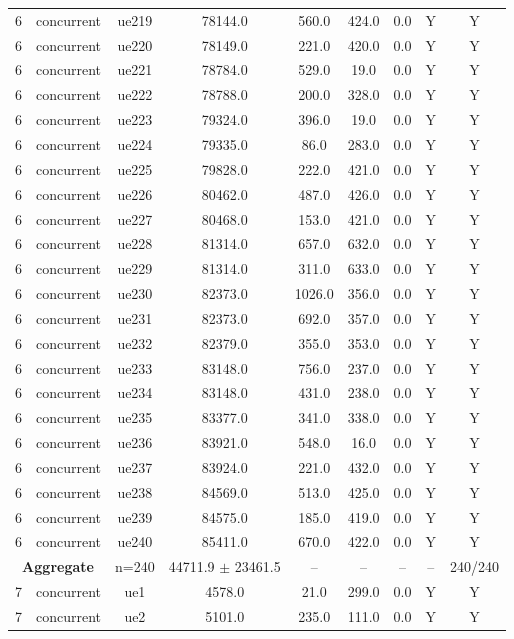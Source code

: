 \begin{table}[ht]
\begin{tabular}{|c|c|c|c|c|c|c|c|c|}
6 & concurrent & ue219 & 78144.0 & 560.0 & 424.0 & 0.0 & Y & Y \\
6 & concurrent & ue220 & 78149.0 & 221.0 & 420.0 & 0.0 & Y & Y \\
6 & concurrent & ue221 & 78784.0 & 529.0 & 19.0 & 0.0 & Y & Y \\
6 & concurrent & ue222 & 78788.0 & 200.0 & 328.0 & 0.0 & Y & Y \\
6 & concurrent & ue223 & 79324.0 & 396.0 & 19.0 & 0.0 & Y & Y \\
6 & concurrent & ue224 & 79335.0 & 86.0 & 283.0 & 0.0 & Y & Y \\
6 & concurrent & ue225 & 79828.0 & 222.0 & 421.0 & 0.0 & Y & Y \\
6 & concurrent & ue226 & 80462.0 & 487.0 & 426.0 & 0.0 & Y & Y \\
6 & concurrent & ue227 & 80468.0 & 153.0 & 421.0 & 0.0 & Y & Y \\
6 & concurrent & ue228 & 81314.0 & 657.0 & 632.0 & 0.0 & Y & Y \\
6 & concurrent & ue229 & 81314.0 & 311.0 & 633.0 & 0.0 & Y & Y \\
6 & concurrent & ue230 & 82373.0 & 1026.0 & 356.0 & 0.0 & Y & Y \\
6 & concurrent & ue231 & 82373.0 & 692.0 & 357.0 & 0.0 & Y & Y \\
6 & concurrent & ue232 & 82379.0 & 355.0 & 353.0 & 0.0 & Y & Y \\
6 & concurrent & ue233 & 83148.0 & 756.0 & 237.0 & 0.0 & Y & Y \\
6 & concurrent & ue234 & 83148.0 & 431.0 & 238.0 & 0.0 & Y & Y \\
6 & concurrent & ue235 & 83377.0 & 341.0 & 338.0 & 0.0 & Y & Y \\
6 & concurrent & ue236 & 83921.0 & 548.0 & 16.0 & 0.0 & Y & Y \\
6 & concurrent & ue237 & 83924.0 & 221.0 & 432.0 & 0.0 & Y & Y \\
6 & concurrent & ue238 & 84569.0 & 513.0 & 425.0 & 0.0 & Y & Y \\
6 & concurrent & ue239 & 84575.0 & 185.0 & 419.0 & 0.0 & Y & Y \\
6 & concurrent & ue240 & 85411.0 & 670.0 & 422.0 & 0.0 & Y & Y \\
\multicolumn{2}{|c|}{\textbf{Aggregate}} & n=240 & 44711.9 $\pm$ 23461.5 & -- & -- & -- & -- & 240/240 \\
\hline
7 & concurrent & ue1 & 4578.0 & 21.0 & 299.0 & 0.0 & Y & Y \\
7 & concurrent & ue2 & 5101.0 & 235.0 & 111.0 & 0.0 & Y & Y \\

\end{tabular}
\end{table}
